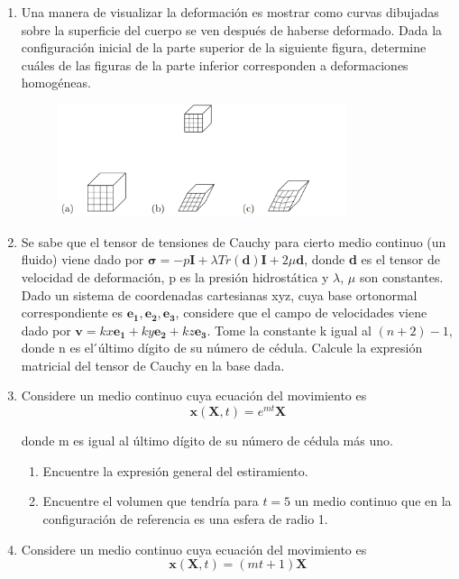 \documentclass[12pt,a4paper]{article}
\title{\mathbf{Mecánica de Medios Continuos \\Práctica 3 \\ Descripción de la deformación}}
\author{Universidad de Cuenca}
\begin{document}
\maketitle
\begin{enumerate}
    \item Una manera de visualizar la deformación es mostrar como curvas dibujadas sobre la superficie del cuerpo se ven después de haberse deformado. Dada la configuración inicial de la parte superior de la siguiente figura, determine cuáles de las figuras de la parte inferior corresponden a deformaciones homogéneas.
    \begin{figure}[H]
        \centering
        \includegraphics[width=0.8\textwidth]{tp3-1.png}
    
    \end{figure}
    \item Se sabe que el tensor de tensiones de Cauchy para cierto medio continuo
    (un fluido) viene dado por $\boldsymbol{\sigma} = -p\mathbf{I} + \lambda Tr(\mathbf{d})\mathbf{I} + 2\mu\mathbf{d}$, donde \textbf{d} es el
    tensor de velocidad de deformación, p es la presión hidrostática y $\lambda$, $\mu$ son
    constantes. Dado un sistema de coordenadas cartesianas xyz, cuya base
    ortonormal correspondiente es ${\mathbf{e_1, e_2, e_3}}$, considere que el campo de
    velocidades viene dado por $\mathbf{v} = kx\mathbf{e_1} + ky\mathbf{e_2} + kz\mathbf{e_3}$. Tome la constante k
    igual al $(n + 2)-1$, donde n es el  ́último dígito de su número de cédula.
    Calcule la expresión matricial del tensor de Cauchy en la base dada.
    \item Considere un medio continuo cuya ecuación del movimiento es
    \begin{equation}
        \mathbf{x}(\mathbf{X},t)=e^{mt}\mathbf{X}
    \end{equation}
    
    donde m es igual al último dígito de su número de cédula más uno.
    \begin{enumerate}
        \item Encuentre la expresión general del estiramiento.
        \item Encuentre el volumen que tendría para $t=5$ un medio continuo que en la
        configuración de referencia es una esfera de radio 1.
    \end{enumerate}
   \item Considere un medio continuo cuya ecuación del movimiento es
   \begin{equation}
       \mathbf{x}(\mathbf{X},t)=(mt+1)\mathbf{X}
   \end{equation}
   

\end{enumerate}
\end{document}
